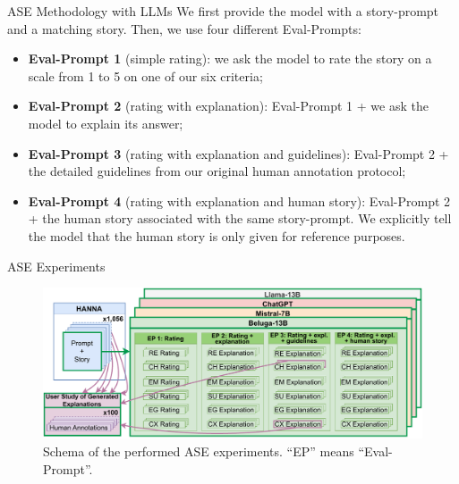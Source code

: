 \begin{frame}{ASE Methodology with LLMs}
    We first provide the model with a story-prompt and a matching story. Then, we use four different Eval-Prompts:
    \begin{itemize}
        \item \textbf{Eval-Prompt 1} (simple rating): we ask the model to rate the story on a scale from 1 to 5 on one of our six criteria;
        \item \textbf{Eval-Prompt 2} (rating with explanation): Eval-Prompt 1 + we ask the model to explain its answer;
        \item \textbf{Eval-Prompt 3} (rating with explanation and guidelines): Eval-Prompt 2 + the detailed guidelines from our original human annotation protocol;
        \item \textbf{Eval-Prompt 4} (rating with explanation and human story): Eval-Prompt 2 + the human story associated with the same story-prompt. We explicitly tell the model that the human story is only given for reference purposes.
    \end{itemize}
\end{frame}

\begin{frame}{ASE Experiments}
    \begin{figure}
        \centering
        \includegraphics[width=\columnwidth]{pictures/llm_schema.pdf}
        \caption{Schema of the performed ASE experiments. ``EP'' means ``Eval-Prompt''.}
        \label{fig:llm_schema}
    \end{figure}
\end{frame}

